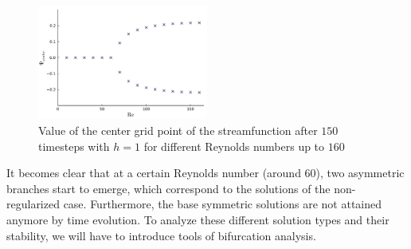 \begin{figure}[h!]
\begin{center}
  \includegraphics[width=0.5\textwidth]{figs/timestepping64x64.pdf}
\end{center}
\caption{Value of the center grid point of the streamfunction after $150$
  timesteps with $h=1$ for different Reynolds numbers up to $160$}
\label{fig:timestepping}
\end{figure}

It becomes clear that at a certain Reynolds number (around $60$), two
asymmetric branches start to emerge, which correspond to the solutions of the
non-regularized case. Furthermore, the base symmetric solutions are not
attained anymore by time evolution. To analyze these different solution types
and their stability, we will have to introduce tools of bifurcation analysis.
